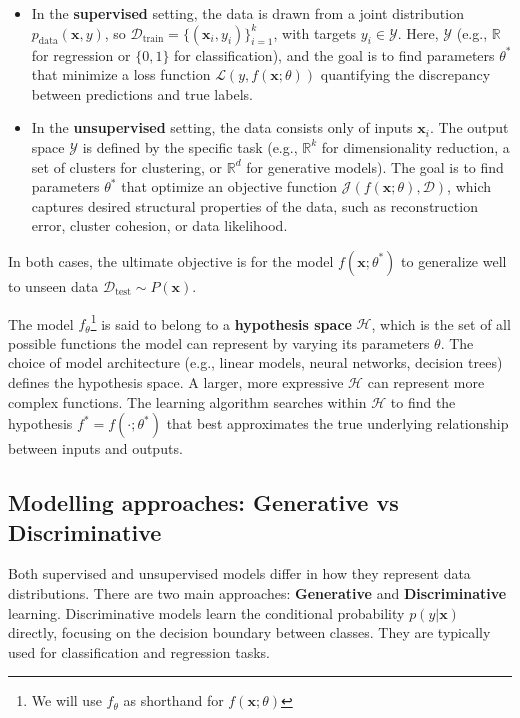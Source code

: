 \begin{itemize}
    \item In the \textbf{supervised} setting, the data is drawn from a joint distribution $p_{\text{data}}(\mathbf{x}, y)$, 
    so $\mathcal{D}_{\text{train}} = \{(\mathbf{x}_i, y_i)\}_{i=1}^{k}$, with targets $y_i \in \mathcal{Y}$. 
    Here, $\mathcal{Y}$ (e.g., $\mathbb{R}$ for regression or $\{0,1\}$ for classification), 
    and the goal is to find parameters $\theta^*$ that minimize a loss function $\mathcal{L}(y, f(\mathbf{x}; \theta))$ 
    quantifying the discrepancy between predictions and true labels.

    \item In the \textbf{unsupervised} setting, the data consists only of inputs $\mathbf{x}_i$. 
    The output space $\mathcal{Y}$ is defined by the specific task (e.g., $\mathbb{R}^k$ for dimensionality reduction, 
    a set of clusters for clustering, or $\mathbb{R}^d$ for generative models). The goal is to find parameters $\theta^*$
     that optimize an objective function $\mathcal{J}(f(\mathbf{x}; \theta), \mathcal{D})$,
      which captures desired structural properties of the data, such as reconstruction error, cluster cohesion, or data likelihood.
\end{itemize}
In both cases, the ultimate objective is for the model $f(\mathbf{x}; \theta^*)$ to generalize well to unseen data $\mathcal{D}_{\text{test}} \sim P(\mathbf{x})$. 

The model $f_{\theta}$\footnote{We will use $f_{\theta}$ as shorthand for $f(\mathbf{x}; \theta)$}  is said to belong to a \textbf{hypothesis space} $\mathcal{H}$, 
which is the set of all possible functions the model can represent by varying its parameters $\theta$.
The choice of model architecture (e.g., linear models, neural networks, decision trees) \cite{lecun2015deep}
defines the hypothesis space. A larger, more expressive $\mathcal{H}$ can represent more complex functions.
The learning algorithm searches within $\mathcal{H}$ to find the hypothesis 
$f^* = f(\cdot; \theta^*)$ that best approximates the true underlying relationship between inputs and outputs.

\subsection{Modelling approaches: Generative vs Discriminative}
Both supervised and unsupervised models differ in how they represent data distributions.
There are two main approaches: \textbf{Generative} and \textbf{Discriminative} learning.\newline
Discriminative models learn the conditional probability $p(y|\mathbf{x})$ directly, focusing on the decision boundary between classes. They are typically used for classification and regression tasks.

